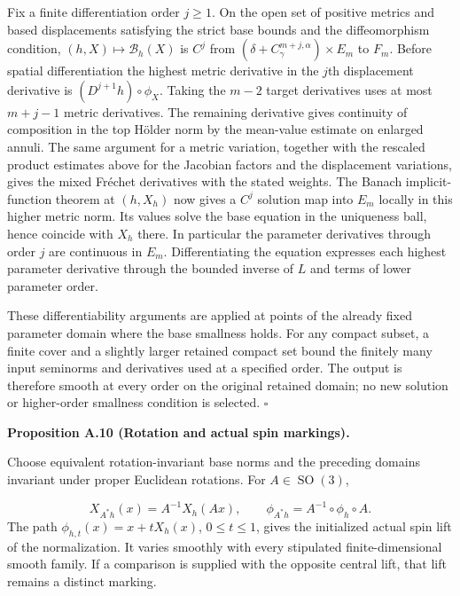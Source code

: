 \documentclass[
  english,
  11pt,
  reqno]{amsart}
\makeatletter
\newcommand{\pandocstatementheading}[1]{%
  \par\addpenalty{\@beginparpenalty}%
  \addvspace{.5\baselineskip plus .2\baselineskip minus .2\baselineskip}%
  {\normalfont\bfseries #1\par}%
  \nobreak\@afterindenttrue\@afterheading
}
\makeatother
\begin{document}
Fix a finite differentiation order \(j\ge1\). On the open set of
positive metrics and based displacements satisfying the strict base
bounds and the diffeomorphism condition, \((h,X)\mapsto\mathcal B_h(X)\)
is \(C^j\) from \((\delta+C_\gamma^{m+j,\alpha})\times E_m\) to \(F_m\).
Before spatial differentiation the highest metric derivative in the
\(j\)th displacement derivative is \((D^{j+1}h)\circ\phi_X\). Taking the
\(m-2\) target derivatives uses at most \(m+j-1\) metric derivatives.
The remaining derivative gives continuity of composition in the top
Hölder norm by the mean-value estimate on enlarged annuli. The same
argument for a metric variation, together with the rescaled product
estimates above for the Jacobian factors and the displacement
variations, gives the mixed Fréchet derivatives with the stated weights.
The Banach implicit-function theorem at \((h,X_h)\) now gives a \(C^j\)
solution map into \(E_m\) locally in this higher metric norm. Its values
solve the base equation in the uniqueness ball, hence coincide with
\(X_h\) there. In particular the parameter derivatives through order
\(j\) are continuous in \(E_m\). Differentiating the equation expresses
each highest parameter derivative through the bounded inverse of \(L\)
and terms of lower parameter order.

These differentiability arguments are applied at points of the already
fixed parameter domain where the base smallness holds. For any compact
subset, a finite cover and a slightly larger retained compact set bound
the finitely many input seminorms and derivatives used at a specified
order. The output is therefore smooth at every order on the original
retained domain; no new solution or higher-order smallness condition is
selected. \hfill\(\square\)

\pandocstatementheading{\leavevmode{}\label{prop:online-gauge-rotation-and-spin}Proposition A.10 (Rotation and actual spin markings).}

Choose equivalent rotation-invariant base norms and the preceding
domains invariant under proper Euclidean rotations. For
\(A\in\operatorname{SO}(3)\),

\label{eq:online-gauge-rotation-equivariance} \[
X_{A^*h}(x)=A^{-1}X_h(Ax),
\qquad
\phi_{A^*h}=A^{-1}\circ\phi_h\circ A.
\] The path \(\phi_{h,t}(x)=x+tX_h(x)\), \(0\le t\le1\), gives the
initialized actual spin lift of the normalization. It varies smoothly
with every stipulated finite-dimensional smooth family. If a comparison
is supplied with the opposite central lift, that lift remains a distinct
marking.
\end{document}
